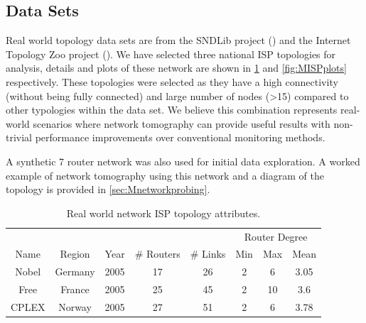 \subsection{Data Sets}
\label{ssec:Mdatasets}
Real world topology data sets are from the SNDLib project (\cite{orlowski_sndlib_2007}) and the Internet Topology Zoo project (\cite{knight_internet_2011}). We have selected three national ISP topologies for analysis, details and plots of these network are shown in \cref{tbl:Mrealnetworkattributes} and \cref{fig:MISPplots} respectively. These topologies were selected as they have a high connectivity (without being fully connected) and large number of nodes (>15) compared to other typologies within the data set. We believe this combination represents real-world scenarios where network tomography can provide useful results with non-trivial performance improvements over conventional monitoring methods.\par
A synthetic 7 router network was also used for initial data exploration. A worked example of network tomography using this network and a diagram of the topology is provided in \cref{sec:Mnetworkprobing}.\par
\begin{table}
    \centering
    \begin{tabular}{@{}cccccccc@{}} 
      \toprule
      &&&&&\multicolumn{3}{c}{Router Degree}\\
      \cmidrule{6-8}
      Name & Region & Year & \# Routers & \# Links & Min & Max & Mean \\
      \midrule
      Nobel & Germany & 2005 & 17 & 26 & 2 & 6 & 3.05\\
      Free & France & 2005 & 25 & 45 & 2 & 10 & 3.6\\
      CPLEX & Norway & 2005 & 27 & 51 & 2 & 6 & 3.78\\
      \bottomrule
    \end{tabular}
    \caption{Real world network ISP topology attributes.}
    \label{tbl:Mrealnetworkattributes}
  \end{table}

